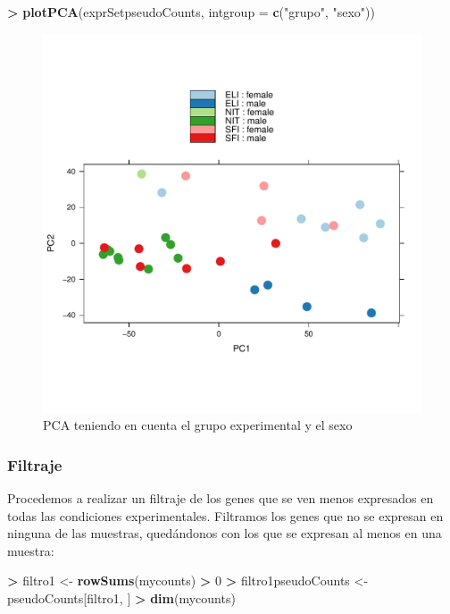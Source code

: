 \documentclass[
  english,
]{article}
\newenvironment{Shaded}{\begin{snugshade}}{\end{snugshade}}
\newcommand{\DataTypeTok}[1]{\textcolor[rgb]{0.13,0.29,0.53}{#1}}
\newcommand{\DecValTok}[1]{\textcolor[rgb]{0.00,0.00,0.81}{#1}}
\newcommand{\KeywordTok}[1]{\textcolor[rgb]{0.13,0.29,0.53}{\textbf{#1}}}
\newcommand{\NormalTok}[1]{#1}
\newcommand{\OperatorTok}[1]{\textcolor[rgb]{0.81,0.36,0.00}{\textbf{#1}}}
\newcommand{\StringTok}[1]{\textcolor[rgb]{0.31,0.60,0.02}{#1}}
\begin{document}
\begin{Shaded}
\begin{Highlighting}[]
\OperatorTok{>}\StringTok{ }\KeywordTok{plotPCA}\NormalTok{(exprSetpseudoCounts, }\DataTypeTok{intgroup =} \KeywordTok{c}\NormalTok{(}\StringTok{"grupo"}\NormalTok{, }\StringTok{"sexo"}\NormalTok{))}
\end{Highlighting}
\end{Shaded}

\begin{figure}
\centering
\includegraphics{ortega_rita_ADO_PEC2_files/figure-latex/plotPCA_sexo-1.pdf}
\caption{PCA teniendo en cuenta el grupo experimental y el sexo}
\end{figure}

\hypertarget{filtraje}{%
\subsubsection{Filtraje}\label{filtraje}}

Procedemos a realizar un filtraje de los genes que se ven menos
expresados en todas las condiciones experimentales. Filtramos los genes
que no se expresan en ninguna de las muestras, quedándonos con los que
se expresan al menos en una muestra:

\begin{Shaded}
\begin{Highlighting}[]
\OperatorTok{>}\StringTok{ }\NormalTok{filtro1 <-}\StringTok{ }\KeywordTok{rowSums}\NormalTok{(mycounts) }\OperatorTok{>}\StringTok{ }\DecValTok{0}
\OperatorTok{>}\StringTok{ }\NormalTok{filtro1pseudoCounts <-}\StringTok{ }\NormalTok{pseudoCounts[filtro1, ]}
\OperatorTok{>}\StringTok{ }\KeywordTok{dim}\NormalTok{(mycounts)}
\end{Highlighting}
\end{Shaded}
\end{document}
